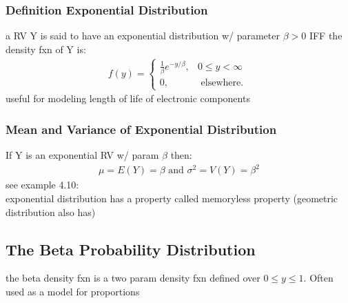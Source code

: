 \documentclass[12pt]{article}
\begin{document}
    \subsubsection{Definition Exponential Distribution}
        a RV Y is said to have an exponential distribution w/ parameter
        $ \beta > 0 $ IFF the density fxn of Y is:
        \begin{align*}
            f(y) = 
            \begin{cases}
                \frac{1}{\beta}e^{-y /\beta},& 0 \le y < \infty \\
                0, & \text{ elsewhere. }
            \end{cases}
        \end{align*}
        useful for modeling length of life of electronic components
    \subsubsection{Mean and Variance of Exponential Distribution}
        If Y is an exponential RV w/ param $ \beta $ then:
        \begin{align*}
            \mu = E(Y) = \beta \text{ and } \sigma^2 = V(Y) = \beta^2 
        \end{align*}
        see example 4.10:\\
        exponential distribution has a property called memoryless
        property (geometric distribution also has)      
\subsection{The Beta Probability Distribution}
    the beta density fxn is a two param density fxn defined over
    $ 0 \le y \le 1 $. Often used as a model for proportions
\end{document}
